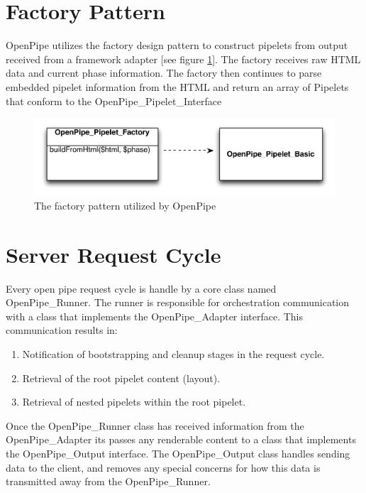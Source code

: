 \documentclass[12pt]{report}
\begin{document}
\section{Factory Pattern}
OpenPipe utilizes the factory design pattern to construct pipelets from output received from a framework adapter [see figure \ref{fig:factoryPattern}]. The factory receives raw HTML data and current phase information. The factory then continues to parse embedded pipelet information from the HTML and return an array of Pipelets that conform to the OpenPipe\_Pipelet\_Interface 

\begin{figure}[H]
\label{fig:factoryPattern}
\centering
\includegraphics[width=\textwidth,keepaspectratio]{figures/images/factory_pipelets.pdf}
\caption{The factory pattern utilized by OpenPipe}
\end{figure}


\section{Server Request Cycle}
Every open pipe request cycle is handle by a core class named OpenPipe\_Runner. The runner is responsible for orchestration communication with a class that implements the OpenPipe\_Adapter interface. This communication results in:

\begin{enumerate}
\item Notification of bootstrapping and cleanup stages in the request cycle.
\item Retrieval of the root pipelet content (layout).
\item Retrieval of nested pipelets within the root pipelet.
\end{enumerate}

Once the OpenPipe\_Runner class has received information from the OpenPipe\_Adapter its passes any renderable content to a class that implements the OpenPipe\_Output interface. The OpenPipe\_Output class handles sending data to the client, and removes any special concerns for how this data is transmitted away from the OpenPipe\_Runner.
\end{document}
